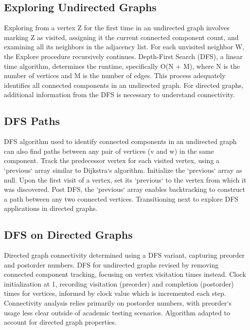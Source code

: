 \subsection*{Exploring Undirected Graphs}
Exploring from a vertex Z for the first time in an undirected graph involves marking Z as visited, assigning it the current connected component count, and examining all its neighbors in the adjacency list.
For each unvisited neighbor W, the Explore procedure recursively continues.
Depth-First Search (DFS), a linear time algorithm, determines the runtime, specifically O(N + M), where N is the number of vertices and M is the number of edges.
This process adequately identifies all connected components in an undirected graph.
For directed graphs, additional information from the DFS is necessary to understand connectivity.

\subsection*{DFS  Paths}
DFS algorithm used to identify connected components in an undirected graph can also find paths between any pair of vertices (v and w) in the same component.
Track the predecessor vertex for each visited vertex, using a `previous` array similar to Dijkstra`s algorithm.
Initialize the `previous` array as null.
Upon the first visit of a vertex, set its `previous` to the vertex from which it was discovered.
Post DFS, the `previous` array enables backtracking to construct a path between any two connected vertices.
Transitioning next to explore DFS applications in directed graphs.

\subsection*{DFS on Directed Graphs}
Directed graph connectivity determined using a DFS variant, capturing preorder and postorder numbers.
DFS for undirected graphs revised by removing connected component tracking, focusing on vertex visitation times instead.
Clock initialization at 1, recording visitation (preorder) and completion (postorder) times for vertices, informed by clock value which is incremented each step.
Connectivity analysis relies primarily on postorder numbers, with preorder`s usage less clear outside of academic testing scenarios.
Algorithm adapted to account for directed graph properties.

